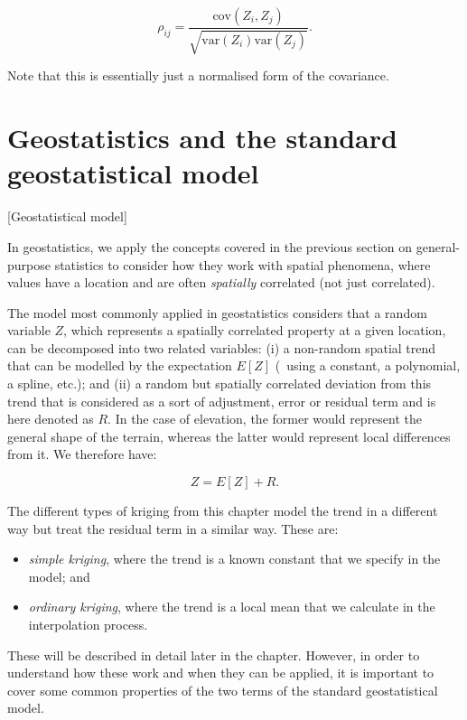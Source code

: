 \begin{equation}
\rho_{ij}=\frac{\mathrm{cov}(Z_i, Z_j)}{\sqrt{\mathrm{var}(Z_i) \mathrm{var}(Z_j)}}. \nonumber
\end{equation}

Note that this is essentially just a normalised form of the covariance.

\section{Geostatistics and the standard geostatistical model}[Geostatistical model]

In geostatistics, we apply the concepts covered in the previous section on general-purpose statistics to consider how they work with spatial phenomena, where values have a location and are often \emph{spatially} correlated (not just correlated).

The model most commonly applied in geostatistics considers that a random variable \(Z\), which represents a spatially correlated property at a given location, can be decomposed into two related variables: (i) a non-random spatial trend that can be modelled by the expectation \(E[Z]\) (\eg\ using a constant, a polynomial, a spline, etc.); and (ii) a random but spatially correlated deviation from this trend that is considered as a sort of adjustment, error or residual term and is here denoted as \(R\).
In the case of elevation, the former would represent the general shape of the terrain, whereas the latter would represent local differences from it.
We therefore have:

\begin{equation}
\label{eq:geostat}
Z = E\left[Z\right] + R.
\end{equation}

The different types of kriging from this chapter model the trend in a different way but treat the residual term in a similar way.
These are:
\begin{itemize}
\item \emph{simple kriging}, where the trend is a known constant that we specify in the model; and
\item \emph{ordinary kriging}, where the trend is a local mean that we calculate in the interpolation process.
\end{itemize}

These will be described in detail later in the chapter.
However, in order to understand how these work and when they can be applied, it is important to cover some common properties of the two terms of the standard geostatistical model.

